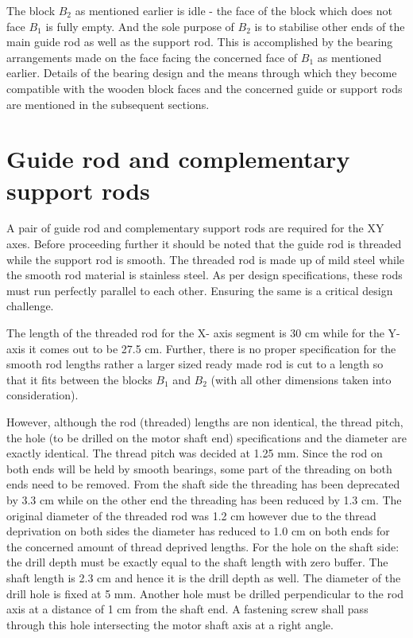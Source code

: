 The block $B_{2}$ as mentioned earlier is idle - the face of the block which does not face $B_{1}$ is fully empty. And the sole purpose of $B_{2}$ is to stabilise other ends of the main guide rod as well as the support rod. This is accomplished by the bearing arrangements made on the face facing the concerned face of $B_{1}$ as mentioned earlier. Details of the bearing design and the means through which they become compatible with the wooden block faces and the concerned guide or support rods are mentioned in the subsequent sections.


\section{Guide rod and complementary support rods}

A pair of guide rod and complementary support rods are required for the XY axes. Before proceeding further it should be noted that the guide rod is threaded while the support rod is smooth. The threaded rod is made up of mild steel while the smooth rod material is stainless steel. As per design specifications, these rods must run perfectly parallel to each other. Ensuring the same is a critical design challenge. \par

The length of the threaded rod for the X- axis segment is 30 cm while for the Y- axis it comes out to be 27.5 cm. Further, there is no proper specification for the smooth rod lengths rather a larger sized ready made rod is cut to a length so that it fits between the blocks $B_{1}$ and $B_{2}$ (with all other dimensions taken into consideration). \par

However, although the rod (threaded) lengths are non identical, the thread pitch, the hole (to be drilled on the motor shaft end) specifications and the diameter are exactly identical. The thread pitch was decided at 1.25 mm. Since the rod on both ends will be held by smooth bearings, some part of the threading on both ends need to be removed. From the shaft side the threading has been deprecated by 3.3 cm while on the other end the threading has been reduced by 1.3 cm. The original diameter of the threaded rod was 1.2 cm however due to the thread deprivation on both sides the diameter has reduced to 1.0 cm on both ends for the concerned amount of thread deprived lengths. For the hole on the shaft side: the drill depth must be exactly equal to the shaft length with zero buffer. The shaft length is 2.3 cm and hence it is the drill depth as well. The diameter of the drill hole is fixed at 5 mm. Another hole must be drilled perpendicular to the rod axis at a distance of 1 cm from the shaft end. A fastening screw shall pass through this hole intersecting the motor shaft axis at a right angle.

